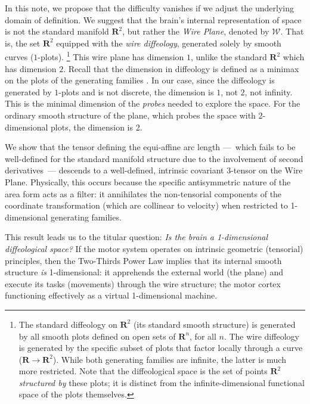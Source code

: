 \documentclass[10pt,letterpaper,reqno]{amsart}
\newcommand{\RR}{\mathbf{R}}
\newcommand{\cW}{\mathcal{W}}
\begin{document}
  In this note,
  we propose that the difficulty vanishes if we adjust the underlying domain of definition.
  We suggest that the brain's internal representation of space is not the standard manifold $\RR^2$,
  but rather the \emph{Wire Plane},
  denoted by $\cW$.
  That is,
  the set $\RR^2$ equipped with the \emph{wire diffeology},
  generated solely by smooth curves ($1$-plots).%
  \footnote{The standard diffeology on $\RR^2$ (its standard smooth structure) is generated by all smooth plots defined on open sets of $\RR^n$, for all $n$.
  The wire diffeology is generated by the specific subset of plots that factor locally through a curve ($\RR \to \RR^2$).
  While both generating families are infinite, the latter is much more restricted.
  Note that the diffeological space is the set of points $\RR^2$ \emph{structured by} these plots;
  it is distinct from the infinite-dimensional functional space of the plots themselves.}
  This wire plane has dimension $1$,
  unlike the standard $\RR^2$ which has dimension $2$.
  Recall that the dimension in diffeology is defined as a minimax on the plots of the generating families \cite[]{PIZ13}.
  In our case,
  since the diffeology is generated by $1$-plots and is not discrete,
  the dimension is $1$,
  not $2$,
  not infinity.
  This is the minimal dimension of the \emph{probes} needed to explore the space.
  For the ordinary smooth structure of the plane,
  which probes the space with 2-dimensional plots,
  the dimension is 2.
  
  We show that the tensor defining the equi-affine arc length
  ---~which fails to be well-defined for the standard manifold structure due to the involvement of second derivatives~---
  descends to a well-defined,
  intrinsic covariant 3-tensor on the Wire Plane.
  Physically,
  this occurs because the specific antisymmetric nature of the area form acts as a filter:
  it annihilates the non-tensorial components of the coordinate transformation (which are collinear to velocity) when restricted to 1-dimensional generating families.
  
  This result leads us to the titular question: \emph{Is the brain a 1-dimensional diffeological space?}
  If the motor system operates on intrinsic geometric (tensorial) principles,
  then the Two-Thirds Power Law implies that its internal smooth structure \emph{is} 1-dimensional:
  it apprehends the external world (the plane) and execute its tasks (movements) through the wire structure;
  the motor cortex functioning effectively as a virtual 1-dimensional machine.
  
\end{document}
